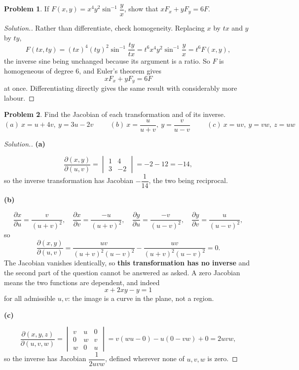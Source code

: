 \documentclass[11pt,a4paper]{article}
\theoremstyle{definition}
\newtheorem{problemx}{Problem}[subsection]
\newenvironment{problem}{\begin{problemx}}{\end{problemx}}
\newenvironment{solution}
  {\renewcommand{\qedsymbol}{}\begin{proof}[\textit{Solution}.]}
  {\end{proof}}
\newcommand{\subhead}[1]{%
  \par\medskip\noindent\textbf{#1}\par\nobreak\smallskip}
\begin{document}
\begin{problem}
If $F(x,y) = x^4y^2\sin^{-1}\dfrac{y}{x}$, show that
$x F_x + y F_y = 6F$.
\end{problem}
\begin{solution}
Rather than differentiate, check homogeneity. Replacing $x$ by $tx$ and $y$ by
$ty$,
$$F(tx,ty) = (tx)^4(ty)^2\sin^{-1}\frac{ty}{tx}
= t^6x^4y^2\sin^{-1}\frac{y}{x} = t^6F(x,y),$$
the inverse sine being unchanged because its argument is a ratio. So $F$ is
homogeneous of degree $6$, and Euler's theorem gives
$$xF_x + yF_y = 6F$$
at once. Differentiating directly gives the same result with considerably more
labour.
\end{solution}

\begin{problem}
Find the Jacobian of each transformation and of its inverse.
$$(a)\ x = u+4v,\ y = 3u-2v\hspace{1cm}
(b)\ x = \frac{u}{u+v},\ y = \frac{v}{u-v}\hspace{1cm}
(c)\ x = uv,\ y = vw,\ z = uw$$
\end{problem}
\begin{solution}
\subhead{(a)}
$$\frac{\partial(x,y)}{\partial(u,v)}
= \begin{vmatrix} 1 & 4\\ 3 & -2\end{vmatrix} = -2-12 = -14 ,$$
so the inverse transformation has Jacobian $-\dfrac{1}{14}$, the two being
reciprocal.

\subhead{(b)}
$$\frac{\partial x}{\partial u} = \frac{v}{(u+v)^2},\quad
\frac{\partial x}{\partial v} = \frac{-u}{(u+v)^2},\quad
\frac{\partial y}{\partial u} = \frac{-v}{(u-v)^2},\quad
\frac{\partial y}{\partial v} = \frac{u}{(u-v)^2},$$
so
$$\frac{\partial(x,y)}{\partial(u,v)}
= \frac{uv}{(u+v)^2(u-v)^2} - \frac{uv}{(u+v)^2(u-v)^2} = 0 .$$
The Jacobian vanishes identically, so \textbf{this transformation has no
inverse} and the second part of the question cannot be answered as asked. A zero
Jacobian means the two functions are dependent, and indeed
$$x + 2xy - y = 1$$
for all admissible $u,v$: the image is a curve in the plane, not a region.

\subhead{(c)}
$$\frac{\partial(x,y,z)}{\partial(u,v,w)}
= \begin{vmatrix}
v & u & 0\\
0 & w & v\\
w & 0 & u
\end{vmatrix}
= v(wu-0) - u(0-vw) + 0 = 2uvw ,$$
so the inverse has Jacobian $\dfrac{1}{2uvw}$, defined wherever none of
$u,v,w$ is zero.
\end{solution}
\end{document}
